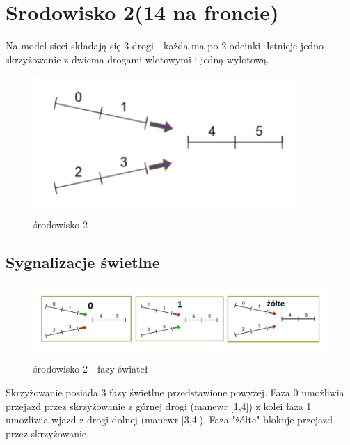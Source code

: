 \documentclass[12pt]{book}
\theoremstyle{plain}
\begin{document}
\section{Srodowisko 2(14 na froncie)}
Na model sieci składają się 3 drogi - każda ma po 2 odcinki. Istnieje jedno skrzyżowanie z dwiema drogami wlotowymi i jedną wylotową.
	\begin{figure}[H]
	\centering
	\includegraphics[width=10cm]{images/env_14}
	\label{fig:env_14}
	\caption{środowisko 2}
\end{figure}

\subsection{Sygnalizacje świetlne}	
\begin{figure}[H]
	\centering
	\includegraphics[width=17cm]{images/env_14_fazy}
	\label{fig:env_14_fazy}
	\caption{środowisko 2 - fazy świateł}
\end{figure}\noindent
Skrzyżowanie posiada 3 fazy świetlne przedstawione powyżej. Faza 0 umożliwia przejazd przez skrzyżowanie z górnej drogi (manewr [1,4]) z kolei faza 1 umożliwia wjazd z drogi dolnej (manewr [3,4]). Faza "żółte" blokuje przejazd przez skrzyżowanie.
\end{document}
